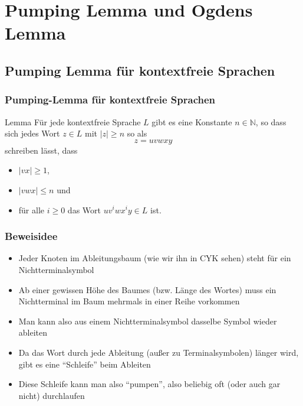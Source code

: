 \section{Pumping Lemma und Ogdens Lemma}
\subsection{Pumping Lemma für kontextfreie Sprachen}
\begin{frame}
\frametitle{Pumping-Lemma für kontextfreie Sprachen}
\begin{exampleblock}{Lemma}
Für jede kontextfreie Sprache $L$ gibt es eine Konstante $n \in \mathbb{N}$,
so dass sich jedes Wort $z \in L$ mit $|z| \geq n$ so als
$$ z = uvwxy $$
schreiben lässt, dass
\begin{itemize}
\item $|vx| \geq 1$,
\item $|vwx| \leq n$ und
\item für alle $i \geq 0$ das Wort $uv^iwx^iy \in L$ ist.
\end{itemize}
\end{exampleblock}
\end{frame}

\begin{frame}
\frametitle{Beweisidee}
\begin{itemize}
\item Jeder Knoten im Ableitungsbaum (wie wir ihn in CYK sehen) steht für ein Nichtterminalsymbol
\item Ab einer gewissen Höhe des Baumes (bzw. Länge des Wortes) muss ein Nichtterminal im Baum mehrmals in einer Reihe vorkommen
\item Man kann also aus einem Nichtterminalsymbol dasselbe Symbol wieder ableiten
\item Da das Wort durch jede Ableitung (außer zu Terminalsymbolen) länger wird, gibt es eine "`Schleife"' beim Ableiten
\item Diese Schleife kann man also "`pumpen"', also beliebig oft (oder auch gar nicht) durchlaufen
\end{itemize}
\end{frame}

